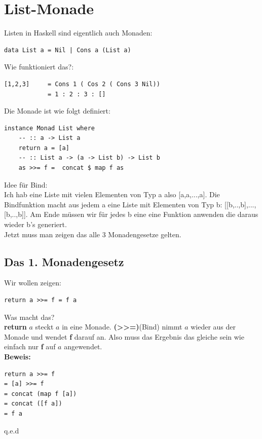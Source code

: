 \documentclass[ngerman,a4paper]{report}
\begin{document}
\section{List-Monade}

Listen in Haskell sind eigentlich auch Monaden:
\begin{lstlisting}
data List a = Nil | Cons a (List a)
\end{lstlisting}

Wie funktioniert das?:
\begin{lstlisting}
[1,2,3] 	= Cons 1 ( Cos 2 ( Cons 3 Nil))
			= 1 : 2 : 3 : []
\end{lstlisting}

Die Monade ist wie folgt definiert:
\begin{lstlisting}
instance Monad List where
	-- :: a -> List a
	return a = [a]
	-- :: List a -> (a -> List b) -> List b
	as >>= f =  concat $ map f as
\end{lstlisting}
Idee für Bind:\\
Ich hab eine Liste mit vielen Elementen von Typ a also [a,a,...,a]. Die Bindfunktion macht aus jedem a eine Liste mit Elementen von Typ b: [[b,..,b],...,[b,..,b]]. Am Ende müssen wir für jedes b eine eine Funktion anwenden die daraus wieder b's generiert. \\

Jetzt muss man zeigen das alle 3 Monadengesetze gelten.

\subsection{Das 1. Monadengesetz}
Wir wollen zeigen:
\begin{lstlisting}
return a >>= f = f a
\end{lstlisting}
Was macht das?\\
\textbf{return} $a$ steckt $a$ in eine Monade. \textbf{(>>=)}(Bind) nimmt $a$ wieder aus der Monade und wendet \textbf{f} darauf an. Also muss das Ergebnis das gleiche sein wie einfach nur \textbf{f} auf $a$ angewendet.\\

\textbf{Beweis:}
\begin{lstlisting}
return a >>= f
= [a] >>= f
= concat (map f [a])
= concat ([f a])
= f a
\end{lstlisting}
q.e.d %
\end{document}
